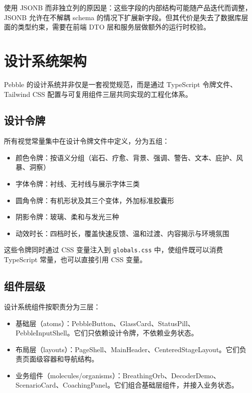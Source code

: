 使用 JSONB 而非独立列的原因是：这些字段的内部结构可能随产品迭代而调整，JSONB 允许在不解耦 schema 的情况下扩展新字段。但其代价是失去了数据库层面的类型约束，需要在前端 DTO 层和服务层做额外的运行时校验。


\section{设计系统架构}


Pebble 的设计系统并非仅是一套视觉规范，而是通过 TypeScript 令牌文件、Tailwind CSS 配置与可复用组件三层共同实现的工程化体系。

\subsection{设计令牌}

所有视觉常量集中在设计令牌文件中定义，分为五组：

\begin{itemize}
  \item 颜色令牌：按语义分组（岩石、疗愈、背景、强调、警告、文本、庇护、风暴、洞察）
  \item 字体令牌：衬线、无衬线与展示字体三类
  \item 圆角令牌：有机形状及其三个变体，外加标准胶囊形
  \item 阴影令牌：玻璃、柔和与发光三种
  \item 动效时长：四档时长，覆盖快速反馈、温和过渡、内容揭示与环境氛围
\end{itemize}

这些令牌同时通过 CSS 变量注入到 \texttt{globals.css} 中，使组件既可以消费 TypeScript 常量，也可以直接引用 CSS 变量。

\subsection{组件层级}

设计系统组件按职责分为三层：

\begin{itemize}
  \item 基础层（atoms）：PebbleButton、GlassCard、StatusPill、PebbleInputShell。它们只依赖设计令牌，不依赖业务状态。
  \item 布局层（layouts）：PageShell、MainHeader、CenteredStageLayout。它们负责页面级容器和导航结构。
  \item 业务组件（molecules/organisms）：BreathingOrb、DecoderDemo、ScenarioCard、CoachingPanel。它们组合基础层组件，并接入业务状态。
\end{itemize}

